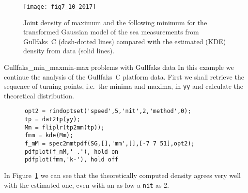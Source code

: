 \begin{figure}[tbh]
\centering  \texttt{[image: fig7\_10\_2017]}
\vspace{-3mm}
  \caption[Joint density of maximum and minimum for Gullfaks~C
data]{
Joint density of maximum and the following minimum for the
transformed Gaussian model of the sea measurements from Gullfaks~C 
(dash-dotted lines) compared with the estimated (KDE)
density from data (solid lines).
}
  \label{fig78}
\end{figure}

\begin{rtex}{Gullfaks_min_max}{min-max problems with Gullfaks data}
In this example we continue the analysis of the  Gullfaks~C platform
data. First we shall retrieve the sequence of turning points, i.e.\ the
minima and maxima, in {\tt yy} and calculate the theoretical distribution.
{\small\begin{verbatim}
      opt2 = rindoptset('speed',5,'nit',2,'method',0);
      tp = dat2tp(yy);
      Mm = fliplr(tp2mm(tp));
      fmm = kde(Mm);
      f_mM = spec2mmtpdf(SG,[],'mm',[],[-7 7 51],opt2);
      pdfplot(f_mM,'-.'), hold on
      pdfplot(fmm,'k-'), hold off
\end{verbatim}
}
In Figure~\ref{fig78} we can see that the theoretically computed density
agrees very well with the estimated one,
even with an as low a {\tt nit} as 2.
\end{rtex}

